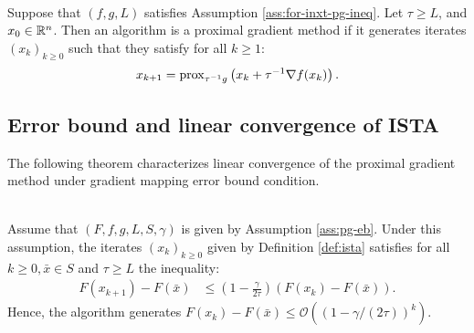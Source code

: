 \documentclass[12pt]{article}
\begin{document}
    \begin{definition}\;\label{def:ista}\\
        Suppose that $(f, g, L)$ satisfies Assumption \ref{ass:for-inxt-pg-ineq}. 
        Let $\tau \ge L$, and $x_0 \in \mathbb R^n$. 
        Then an algorithm is a proximal gradient method if it generates iterates $(x_k)_{k \ge 0}$ such that they satisfy for all $k \ge 1$: 
        \begin{align*}
            x_{k + 1} = \operatorname{prox}_{\tau^{-1} g}\left(x_k + \tau^{-1}\nabla f(x_k)\right). 
        \end{align*}
    \end{definition}
    \subsection{Error bound and linear convergence of ISTA}
        The following theorem characterizes linear convergence of the proximal gradient method under gradient mapping error bound condition. 
        \begin{theorem}\;\label{thm:lin-cnvg-ista-eb}\\
            Assume that $(F, f, g, L, S, \gamma)$ is given by Assumption \ref{ass:pg-eb}. 
            Under this assumption, the iterates $(x_k)_{k \ge 0}$ given by Definition \ref{def:ista} satisfies for all $k \ge 0, \bar x \in S$ and $\tau \ge L$ the inequality: 
            \begin{align*}
                F(x_{k + 1}) - F(\bar x)
                &\le 
                \left(
                    1 - \frac{\gamma}{2\tau}
                \right)(F(x_k) - F(\bar x)). 
            \end{align*}
            Hence, the algorithm generates $F(x_k) - F(\bar x)\le \mathcal O((1 - \gamma/(2\tau))^k)$. 
        \end{theorem}
\end{document}
